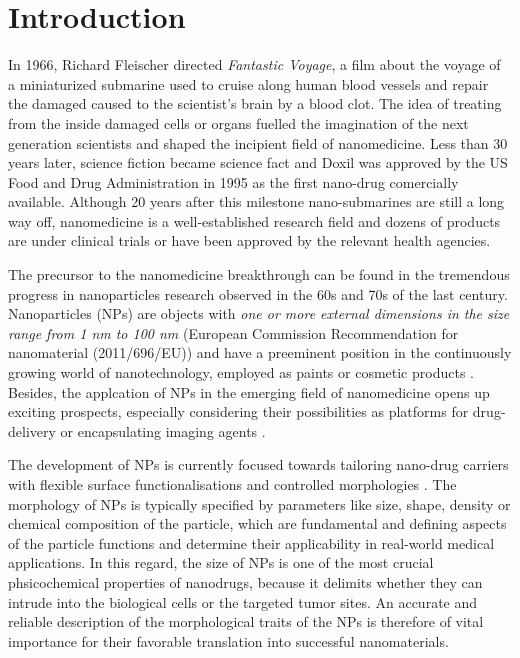 \chapter{Introduction}
\label{chap:introduction}


In 1966, Richard Fleischer directed \emph{Fantastic Voyage}, a film about the voyage of a miniaturized submarine used to cruise along human blood vessels and repair the damaged caused to the scientist's brain by a blood clot. The idea of treating from the inside damaged cells or organs fuelled the imagination of the next generation scientists and shaped the incipient field of nanomedicine. Less than 30 years later, science fiction became science fact and Doxil was approved by the US Food and Drug Administration in 1995 as the first nano-drug comercially available. Although 20 years after this milestone nano-submarines are still a long way off, nanomedicine is a well-established research field and dozens of products are under clinical trials or have been approved by the relevant health agencies.

The precursor to the nanomedicine breakthrough can be found in the tremendous progress in nanoparticles research observed in the 60s and 70s of the last century. Nanoparticles (NPs) are objects with \emph{one or more external dimensions in the size range from 1 nm to 100 nm} (European Commission Recommendation for nanomaterial (2011/696/EU)) and have a preeminent position in the continuously growing world of nanotechnology, employed as paints or cosmetic products \citep{guterres_polymeric_2007}. Besides, the applcation of NPs in the emerging field of nanomedicine opens up exciting prospects, especially considering their possibilities as platforms for drug-delivery \citep{wang_nanoparticle_2012} or encapsulating imaging agents \citep{tao_shape-specific_2011}.

The development of NPs is currently focused towards tailoring nano-drug carriers with flexible surface functionalisations and controlled morphologies \citep{euliss_imparting_2006,yang_shape-memory_2005}. The morphology of NPs is typically specified by parameters like size, shape, density or chemical composition of the particle, which are fundamental and defining aspects of the particle functions and determine their applicability in real-world medical applications. In this regard, the size of NPs is one of the most crucial phsicochemical properties of nanodrugs, because it delimits whether they can intrude into the biological cells or the targeted tumor sites. An accurate and reliable description of the morphological traits of the NPs is therefore of vital importance for their favorable translation into successful nanomaterials.

